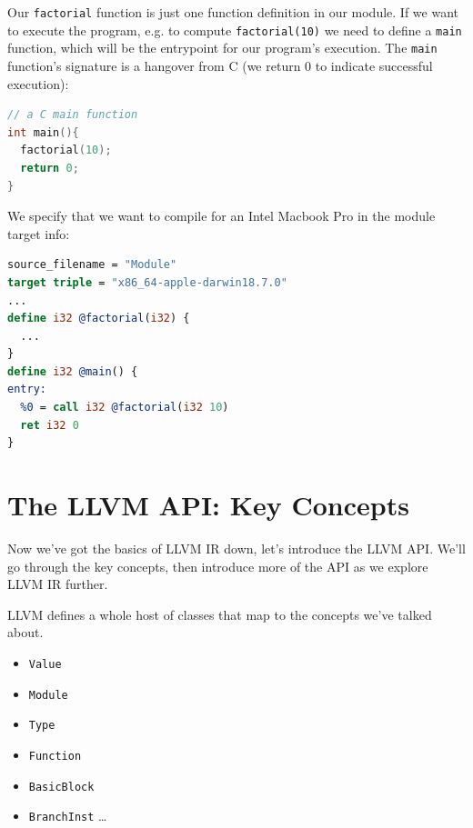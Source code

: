 Our \texttt{factorial} function is just one function definition in our
module. If we want to execute the program, e.g. to compute
\texttt{factorial(10)} we need to define a \texttt{main} function, which
will be the entrypoint for our program's execution. The \texttt{main}
function's signature is a hangover from C (we return 0 to indicate
successful execution):




\begin{lstlisting}[caption={{example\_program.c}},language=C]
// a C main function
int main(){
  factorial(10);
  return 0;
}
\end{lstlisting}

We specify that we want to compile for an Intel Macbook Pro in the
module target info:




\begin{lstlisting}[caption={{example\_module.ll}},language=llvm]
source_filename = "Module"
target triple = "x86_64-apple-darwin18.7.0"
...
define i32 @factorial(i32) {
  ...
}
define i32 @main() {
entry:
  %0 = call i32 @factorial(i32 10)
  ret i32 0
}
\end{lstlisting}

\hypertarget{the-llvm-api-key-concepts}{%
\section{\texorpdfstring{\protect\hyperlink{the-llvm-api-key-concepts}{}The
LLVM API: Key
Concepts}{The LLVM API: Key Concepts}}\label{the-llvm-api-key-concepts}}

Now we've got the basics of LLVM IR down, let's introduce the LLVM API.
We'll go through the key concepts, then introduce more of the API as we
explore LLVM IR further.

LLVM defines a whole host of classes that map to the concepts we've
talked about.

\begin{itemize}
\tightlist
\item
  \texttt{Value}
\item
  \texttt{Module}
\item
  \texttt{Type}
\item
  \texttt{Function}
\item
  \texttt{BasicBlock}
\item
  \texttt{BranchInst} \ldots{}
\end{itemize}

